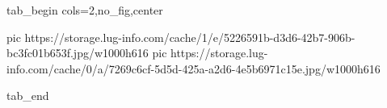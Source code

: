  
 
 
 
 


\ifcmt
  tab_begin cols=2,no_fig,center

     pic https://storage.lug-info.com/cache/1/e/5226591b-d3d6-42b7-906b-bc3fc01b653f.jpg/w1000h616%
		 pic https://storage.lug-info.com/cache/0/a/7269c6cf-5d5d-425a-a2d6-4e5b6971c15e.jpg/w1000h616%

  tab_end
\fi
